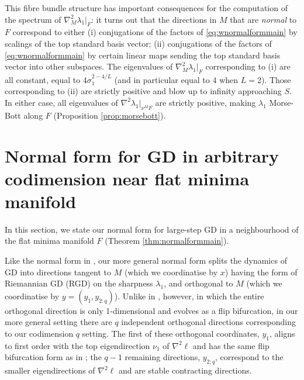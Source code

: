 \documentclass{article}
\theoremstyle{plain}
\theoremstyle{definition}
\theoremstyle{remark}
\begin{document}
This fibre bundle structure has important consequences for the computation of the spectrum of $\nabla^2_M\lambda_1|_F$: it turns out that the directions in $M$ that are \emph{normal} to $F$ correspond to either (i) conjugations of the factors of \eqref{eq:wnormalformmain} by scalings of the top standard basis vector; (ii) conjugations of the factors of \eqref{eq:wnormalformmain} by certain linear maps sending the top standard basis vector into other subspaces. The eigenvalues of $\nabla^2_M\lambda_1|_F$ corresponding to (i) are all constant, equal to $4\sigma_1^{2-4/L}$ (and in particular equal to $4$ when $L=2$). Those corresponding to (ii) are strictly positive and blow up to infinity approaching $S$. In either case, all eigenvalues of $\nabla^2\lambda_1|_{\nu^MF}$ are strictly positive, making $\lambda_1$ Morse-Bott along $F$ (Proposition \ref{prop:morsebott}). 


\section{Normal form for GD in arbitrary codimension near flat minima manifold}\label{sec:normalform}

In this section, we state our normal form for large-step GD in a neighbourhood of the flat minima manifold $F$ (Theorem \ref{thm:normalformmain}).

Like the normal form in \cite{macdonaldeos}, our more general normal form splits the dynamics of GD into directions tangent to $M$ (which we coordinatise by $x$) having the form of Riemannian GD (RGD) on the sharpness $\lambda_1$, and orthogonal to $M$ (which we coordinatise by $y = (y_1,y_{2:q})$). Unlike in \cite{macdonaldeos}, however, in which the entire orthogonal direction is only 1-dimensional and evolves as a flip bifurcation, in our more general setting there are $q$ independent orthogonal directions corresponding to our codimension $q$ setting.  The first of these orthogonal coordinates, $y_1$, aligns to first order with the top eigendirection $\nu_1$ of $\nabla^2\ell$ and has the same flip bifurcation form as in \cite{macdonaldeos}; the $q-1$ remaining directions, $y_{2:q}$, correspond to the smaller eigendirections of $\nabla^2\ell$ and are stable contracting directions.
\end{document}
